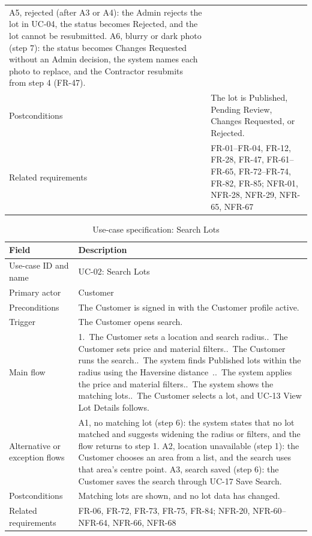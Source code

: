 \begin{table}[H]
\begin{tabularx}{\textwidth}{@{}p{}X@{}}
A5, rejected (after A3 or A4): the Admin rejects the lot in UC-04, the status becomes Rejected, and the lot cannot be resubmitted.\newline
A6, blurry or dark photo (step 7): the status becomes Changes Requested without an Admin decision, the system names each photo to replace, and the Contractor resubmits from step 4 (FR-47). \\
Postconditions & The lot is Published, Pending Review, Changes Requested, or Rejected. \\
Related requirements & FR-01--FR-04, FR-12, FR-28, FR-47, FR-61--FR-65, FR-72--FR-74, FR-82, FR-85; NFR-01, NFR-28, NFR-29, NFR-65, NFR-67 \\
\bottomrule
\end{tabularx}
\end{table}

\begin{table}[H]
\centering
\caption{Use-case specification: Search Lots}
\label{tab:uc-search-lots}
\footnotesize
\begin{tabularx}{\textwidth}{@{}p{}X@{}}
\toprule
\textbf{Field} & \textbf{Description} \\
\midrule
Use-case ID and name & UC-02: Search Lots \\
Primary actor & Customer \\
Preconditions & The Customer is signed in with the Customer profile active. \\
Trigger & The Customer opens search. \\
Main flow & 1.~The Customer sets a location and search radius.\newline
2.~The Customer sets price and material filters.\newline
3.~The Customer runs the search.\newline
4.~The system finds Published lots within the radius using the Haversine distance~\citep{sinnott1984haversine}.\newline
5.~The system applies the price and material filters.\newline
6.~The system shows the matching lots.\newline
7.~The Customer selects a lot, and UC-13 View Lot Details follows. \\
Alternative or exception flows & A1, no matching lot (step 6): the system states that no lot matched and suggests widening the radius or filters, and the flow returns to step 1.\newline
A2, location unavailable (step 1): the Customer chooses an area from a list, and the search uses that area's centre point.\newline
A3, search saved (step 6): the Customer saves the search through UC-17 Save Search. \\
Postconditions & Matching lots are shown, and no lot data has changed. \\
Related requirements & FR-06, FR-72, FR-73, FR-75, FR-84; NFR-20, NFR-60--NFR-64, NFR-66, NFR-68 \\
\bottomrule
\end{tabularx}
\end{table}

